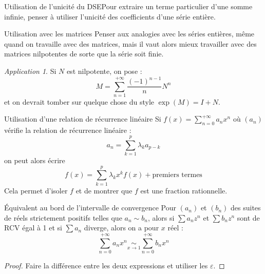 \documentclass[french]{book}
\theoremstyle{plain}
\theoremstyle{definition}
\theoremstyle{remark}
\newtheorem*{app}{Application}
\begin{document}
\begin{AS}{Utilisation de l'unicité du DSE}Pour extraire un terme particulier d’une somme infinie, penser à utiliser l’unicité des coefficients d’une série entière.
\end{AS}
\begin{AS}{Utilisation avec les matrices} Penser aux analogies avec les séries entières, même quand on travaille avec des matrices, mais il vaut alors mieux travailler avec des matrices nilpotentes de sorte que la série soit finie.
\end{AS}
\begin{app}
	Si $N$ est nilpotente, on pose : $$M=\sum_{n=1}^{+\infty}\frac{(-1)^{n-1}}{n}N^n$$ et on devrait tomber sur quelque chose du style $\exp(M)=I+N$.
\end{app}
\begin{AS}{Utilisation d'une relation de récurrence linéaire} Si $f(x)=\displaystyle\sum_{n=0}^{+\infty}a_nx^n$ où $(a_n)$ vérifie la relation de récurrence linéaire : $$a_n=\sum_{k=1}^{p}\lambda_ka_{p-k}$$ on peut alors écrire $$f(x)=\sum_{k=1}^{p}\lambda_k x^kf(x)+\text{premiers termes}$$ Cela permet d'isoler $f$ et de montrer que $f$ est une fraction rationnelle.
\end{AS}
\begin{AS}{Équivalent au bord de l'intervalle de convergence} Pour $(a_n)$ et $(b_n)$ des suites de réels strictement positifs telles que $a_n\sim b_n$, alors si $\sum a_nz^n$ et $\sum b_n z^n$ sont de RCV égal à 1 et si $\sum a_n$ diverge, alors on a pour $x$ réel : $$\sum_{n=0}^{+\infty}a_nx^n\underset{x\to 1}{\sim} \sum_{n=0}^{+\infty}b_nx^n$$
\end{AS}
\begin{proof}
	Faire la différence entre les deux expressions et utiliser les $\varepsilon$.
\end{proof}
\end{document}
